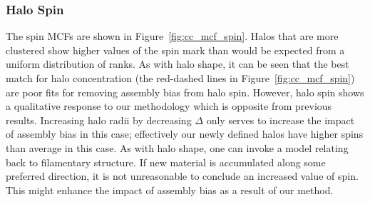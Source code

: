 \documentclass[usenatbib,fleqn]{mnras}
\begin{document}
\subsubsection{Halo Spin}

The spin MCFs are shown in Figure~\ref{fig:cc_mcf_spin}. Halos that are more clustered show higher values of the spin mark than would be expected from a uniform distribution of ranks. As with halo shape, it can be seen that the best match for halo concentration (the red-dashed lines in Figure~\ref{fig:cc_mcf_spin}) are poor fits for removing assembly bias from halo spin.
 However, halo spin shows a qualitative response to our methodology which is opposite from previous results. Increasing halo radii by decreasing $\Delta$ only serves to increase the impact of assembly bias in this case; effectively our newly defined halos have higher spins than average in this case. As with halo shape, one can invoke a model relating back to filamentary structure. If new material is accumulated along some preferred direction, it is not unreasonable to conclude an increased value of spin. This might enhance the impact of assembly bias as a result of our method.
\end{document}
